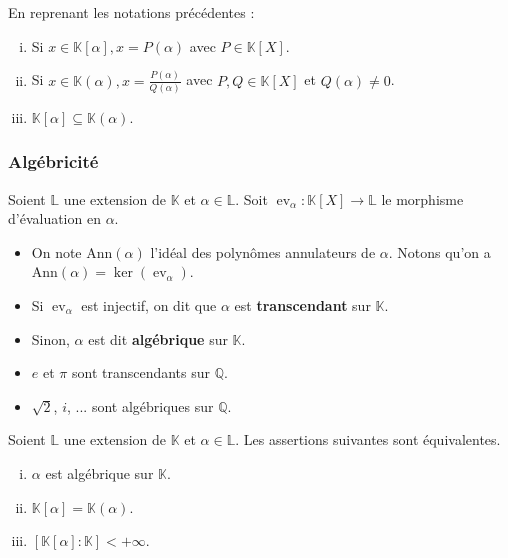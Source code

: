 	\begin{proposition}
		En reprenant les notations précédentes :
		\begin{enumerate}[(i)]
			\item Si $x \in \mathbb{K}[\alpha], x = P(\alpha)$ avec $P \in \mathbb{K}[X]$.
			\item Si $x \in \mathbb{K}(\alpha), x = \frac{P(\alpha)}{Q(\alpha)}$ avec $P, Q \in \mathbb{K}[X]$ et $Q(\alpha) \neq 0$.
			\item $\mathbb{K}[\alpha] \subseteq \mathbb{K}(\alpha)$.
		\end{enumerate}
	\end{proposition}

	\subsubsection{Algébricité}

	\begin{definition}
		Soient $\mathbb{L}$ une extension de $\mathbb{K}$ et $\alpha \in \mathbb{L}$. Soit $\operatorname{ev}_\alpha : \mathbb{K}[X] \rightarrow \mathbb{L}$ le morphisme d'évaluation en $\alpha$.
		\begin{itemize}
			\item On note $\mathrm{Ann}(\alpha)$ l'idéal des polynômes annulateurs de $\alpha$. Notons qu'on a $\mathrm{Ann}(\alpha) = \ker(\operatorname{ev}_\alpha)$.
			\item Si $\operatorname{ev}_\alpha$ est injectif, on dit que $\alpha$ est \textbf{transcendant} sur $\mathbb{K}$.
			\item Sinon, $\alpha$ est dit \textbf{algébrique} sur $\mathbb{K}$.
		\end{itemize}
	\end{definition}

	\begin{example}
		\begin{itemize}
			\item $e$ et $\pi$ sont transcendants sur $\mathbb{Q}$.
			\item $\sqrt{2}$, $i$, ... sont algébriques sur $\mathbb{Q}$.
		\end{itemize}
	\end{example}

	\begin{proposition}
		Soient $\mathbb{L}$ une extension de $\mathbb{K}$ et $\alpha \in \mathbb{L}$. Les assertions suivantes sont équivalentes.
		\begin{enumerate}[(i)]
			\item $\alpha$ est algébrique sur $\mathbb{K}$.
			\item $\mathbb{K}[\alpha] = \mathbb{K}(\alpha)$.
			\item $[\mathbb{K}[\alpha]:\mathbb{K}] < +\infty$.
		\end{enumerate}
	\end{proposition}

